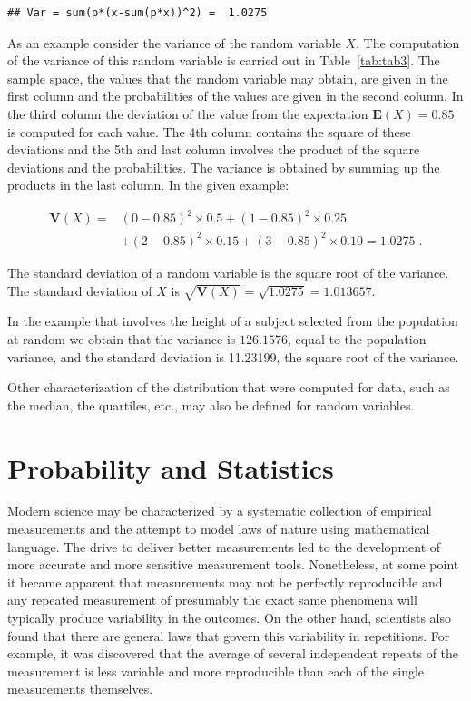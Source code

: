 \documentclass[
]{krantz}
\newcommand{\Expec}{\mathbf{E}}
\newcommand{\Var}{\mathbf{V}}
\theoremstyle{definition}
\theoremstyle{definition}
\theoremstyle{definition}
\theoremstyle{remark}
\begin{document}
\begin{verbatim}
## Var = sum(p*(x-sum(p*x))^2) =  1.0275
\end{verbatim}

As an example consider the variance of the random variable \(X\). The
computation of the variance of this random variable is carried out in
Table~\ref{tab:tab3}. The sample space, the values that the
random variable may obtain, are given in the first column and the
probabilities of the values are given in the second column. In the third
column the deviation of the value from the expectation
\(\Expec(X) = 0.85\) is computed for each value. The 4th column contains
the square of these deviations and the 5th and last column involves the
product of the square deviations and the probabilities. The variance is
obtained by summing up the products in the last column. In the given
example:

\[\begin{aligned}
\Var(X) = & (0-0.85)^2 \times 0.5  + (1-0.85)^2 \times 0.25 \\ &+ (2-0.85)^2\times 0.15 + (3-0.85)^2\times 0.10= 1.0275\;.\end{aligned}\]

The standard deviation of a random variable is the square root of the
variance. The standard deviation of \(X\) is
\(\sqrt{\Var(X)} = \sqrt{1.0275} = 1.013657\).

In the example that involves the height of a subject selected from the
population at random we obtain that the variance is \(126.1576\), equal to
the population variance, and the standard deviation is 11.23199, the
square root of the variance.

Other characterization of the distribution that were computed for data,
such as the median, the quartiles, etc., may also be defined for random
variables.

\hypertarget{probability-and-statistics}{%
\section{Probability and Statistics}\label{probability-and-statistics}}

Modern science may be characterized by a systematic collection of
empirical measurements and the attempt to model laws of nature using
mathematical language. The drive to deliver better measurements led to
the development of more accurate and more sensitive measurement tools.
Nonetheless, at some point it became apparent that measurements may not
be perfectly reproducible and any repeated measurement of presumably the
exact same phenomena will typically produce variability in the outcomes.
On the other hand, scientists also found that there are general laws
that govern this variability in repetitions. For example, it was
discovered that the average of several independent repeats of the
measurement is less variable and more reproducible than each of the
single measurements themselves.
\end{document}
